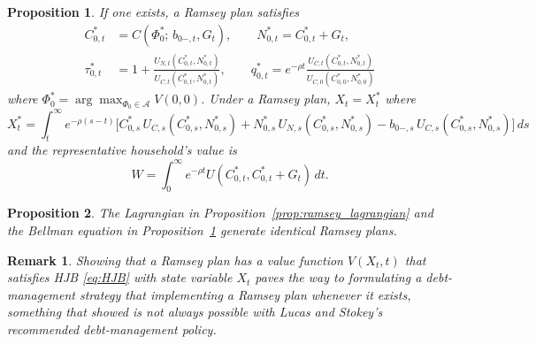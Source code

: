 \documentclass[12pt]{article}
\newtheorem{remark}[theorem]{Remark}
\newtheorem{proposition}{Proposition}
\begin{document}
{\begin{proposition}\label{prop:ramsey_DP}
	If one  exists, a Ramsey plan satisfies
	\begin{align*}
	C_{0,t}^* &= C(\Phi_0^*;\, b_{0-,t}, G_t), \qquad N_{0,t}^* = C_{0,t}^* + G_t, \\
	\tau_{0,t}^* &= 1 + \frac{U_{N,t}(C_{0,t}^*,N_{0,t}^*)}{U_{C,t}(C_{0,t}^*,N_{0,t}^*)}, \qquad q_{0,t}^* = e^{-\rho t}\frac{U_{C,t}(C_{0,t}^*,N_{0,t}^*)}{U_{C,0}(C_{0,0}^*,N_{0,0}^*)}
	\end{align*}
	where $\Phi_0^* = \arg\max_{\Phi_0 \in \mathcal{A}} V(0,0)$. Under a Ramsey plan, $X_t = X_t^*$ where
	\begin{equation}\label{eq:Xstar}
	{X_t^* = \int_t^\infty e^{-\rho(s-t)}\bigl[C_{0,s}^*\, U_{C,s}(C_{0,s}^*, N_{0,s}^*) + N_{0,s}^*\, U_{N,s}(C_{0,s}^*, N_{0,s}^*) - b_{0-,s}\, U_{C,s}(C_{0,s}^*, N_{0,s}^*)\bigr]\, ds}
	\end{equation}
	and the representative household's value is
	\begin{equation}\label{eq:Wstar}
	W = \int_0^\infty e^{-\rho t} U(C_{0,t}^*, C_{0,t}^*+G_t)\, dt.
	\end{equation}
\end{proposition}

\begin{proposition}\label{prop:equivalence}
	The Lagrangian  in Proposition~\ref{prop:ramsey_lagrangian} and  the Bellman equation in Proposition~\ref{prop:ramsey_DP} generate identical Ramsey plans.
\end{proposition}


\begin{remark}\label{rem:Bellmanmatters}
	Showing that a Ramsey plan has a value function $V(X_t,t)$ that %
	satisfies HJB  \eqref{eq:HJB}  with state variable $X_t$ paves the way
	to formulating a debt-management strategy that implementing a Ramsey plan whenever it exists, something that \cite*{debortoli2021optimal} showed is not always
	possible with Lucas and Stokey's recommended debt-management policy.   
\end{remark}


}
\end{document}
